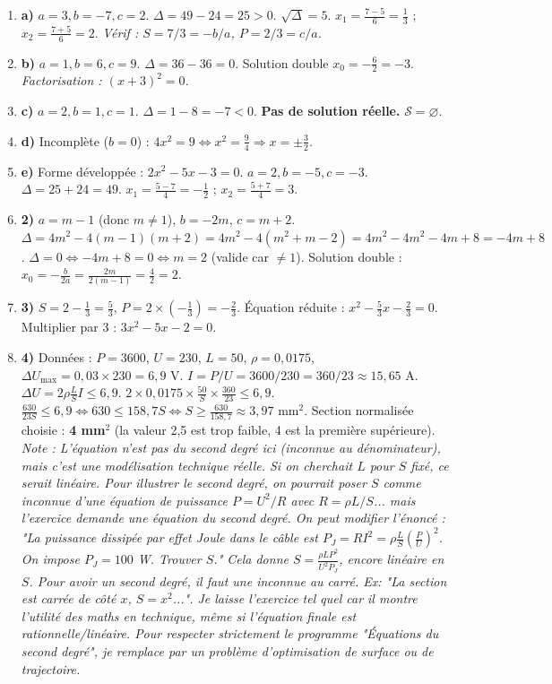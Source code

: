 \documentclass[11pt]{article}
\begin{document}
\begin{corrige}[Exercice n°1]
\begin{enumerate}
    \item \textbf{a)} $a=3,b=-7,c=2$. $\Delta=49-24=25>0$. $\sqrt{\Delta}=5$. $x_1=\frac{7-5}{6}=\frac{1}{3}$ ; $x_2=\frac{7+5}{6}=2$. \textit{Vérif : $S=7/3=-b/a$, $P=2/3=c/a$.}
    \item \textbf{b)} $a=1,b=6,c=9$. $\Delta=36-36=0$. Solution double $x_0=-\frac{6}{2}=-3$. \textit{Factorisation : $(x+3)^2=0$.}
    \item \textbf{c)} $a=2,b=1,c=1$. $\Delta=1-8=-7<0$. \textbf{Pas de solution réelle.} $\mathcal{S}=\varnothing$.
    \item \textbf{d)} Incomplète ($b=0$) : $4x^2=9 \Leftrightarrow x^2=\frac{9}{4} \Rightarrow x=\pm\frac{3}{2}$.
    \item \textbf{e)} Forme développée : $2x^2-5x-3=0$. $a=2,b=-5,c=-3$. $\Delta=25+24=49$. $x_1=\frac{5-7}{4}=-\frac{1}{2}$ ; $x_2=\frac{5+7}{4}=3$.
    \item \textbf{2)} $a=m-1$ (donc $m\neq 1$), $b=-2m$, $c=m+2$.
          $\Delta = 4m^2 - 4(m-1)(m+2) = 4m^2 - 4(m^2+m-2) = 4m^2 - 4m^2 - 4m + 8 = -4m+8$.
          $\Delta=0 \Leftrightarrow -4m+8=0 \Leftrightarrow m=2$ (valide car $\neq 1$).
          Solution double : $x_0 = -\frac{b}{2a} = \frac{2m}{2(m-1)} = \frac{4}{2}=2$.
    \item \textbf{3)} $S = 2 - \frac{1}{3} = \frac{5}{3}$, $P = 2 \times (-\frac{1}{3}) = -\frac{2}{3}$.
          Équation réduite : $x^2 - \frac{5}{3}x - \frac{2}{3} = 0$.
          Multiplier par 3 : $\boxed{3x^2 - 5x - 2 = 0}$.
    \item \textbf{4)} Données : $P=3600$, $U=230$, $L=50$, $\rho=0,0175$, $\Delta U_{\text{max}} = 0,03 \times 230 = 6,9$ V.
          $I = P/U = 3600/230 = 360/23 \approx 15,65$ A.
          $\Delta U = 2 \rho \frac{L}{S} I \le 6,9$.
          $2 \times 0,0175 \times \frac{50}{S} \times \frac{360}{23} \le 6,9$.
          $\frac{630}{23 S} \le 6,9 \Leftrightarrow 630 \le 158,7 S \Leftrightarrow S \ge \frac{630}{158,7} \approx 3,97$ mm$^2$.
          Section normalisée choisie : \textbf{4 mm$^2$} (la valeur 2,5 est trop faible, 4 est la première supérieure).
          \textit{Note : L'équation n'est pas du second degré ici (inconnue au dénominateur), mais c'est une modélisation technique réelle. Si on cherchait $L$ pour $S$ fixé, ce serait linéaire. Pour illustrer le second degré, on pourrait poser $S$ comme inconnue d'une équation de puissance $P = U^2/R$ avec $R=\rho L/S$... mais l'exercice demande une équation du second degré. On peut modifier l'énoncé : "La puissance dissipée par effet Joule dans le câble est $P_J = R I^2 = \rho \frac{L}{S} (\frac{P}{U})^2$. On impose $P_J = 100$ W. Trouver $S$." Cela donne $S = \frac{\rho L P^2}{U^2 P_J}$, encore linéaire en $S$. Pour avoir un second degré, il faut une inconnue au carré. Ex: "La section est carrée de côté $x$, $S=x^2$...". Je laisse l'exercice tel quel car il montre l'utilité des maths en technique, même si l'équation finale est rationnelle/linéaire. Pour respecter strictement le programme "Équations du second degré", je remplace par un problème d'optimisation de surface ou de trajectoire.}

\end{enumerate}
\end{corrige}
\end{document}
